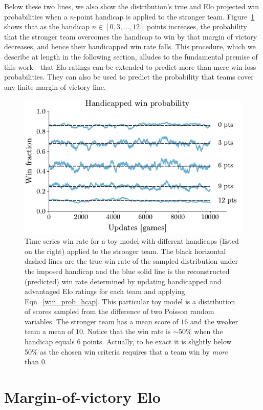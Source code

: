 \documentclass[aps,prc,reprint,amsmath,superscriptaddress]{revtex4-1}
\begin{document}
Below these two lines, we also show the distribution's true and Elo projected win probabilities when a $n$-point handicap is applied to the stronger team.
Figure~\ref{fig:win_rate} shows that as the handicap $n \in [0, 3, ..., 12]$ points increases, the probability that the stronger team overcomes the handicap to win by that margin of victory decreases, and hence their handicapped win rate falls.
This procedure, which we describe at length in the following section, alludes to the fundamental premise of this work---that Elo ratings can be extended to predict more than mere win-loss probabilities.
They can also be used to predict the probability that teams cover any finite margin-of-victory line.
\begin{figure}
  \includegraphics{win_rate}
  \caption{\label{fig:win_rate} Time series win rate for a toy model with different handicaps (listed on the right) applied to the stronger team. The black horizontal dashed lines are the true win rate of the sampled distribution under the imposed handicap and the blue solid line is the reconstructed (predicted) win rate determined by updating handicapped and advantaged Elo ratings for each team and applying Eqn.~\eqref{win_prob_hcap}. This particular toy model is a distribution of scores sampled from the difference of two Poisson random variables. The stronger team has a mean score of $16$ and the weaker team a mean of $10$. Notice that the win rate is $\sim\!50\%$ when the handicap equals $6$ points. Actually, to be exact it is slightly below 50\% as the chosen win criteria requires that a team win by \emph{more} than 0.}
\end{figure}

\section{Margin-of-victory Elo}
\end{document}
